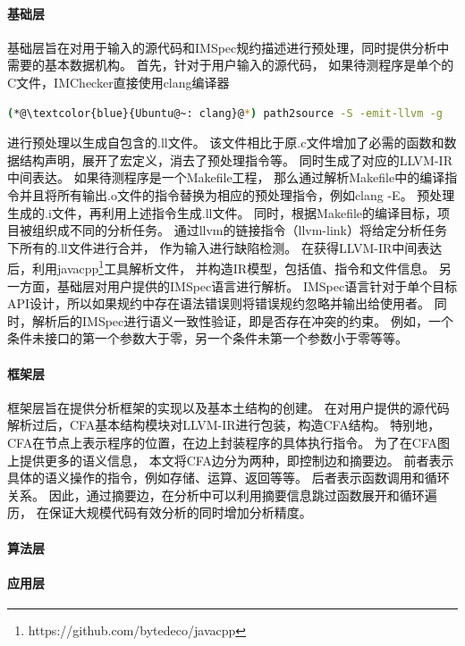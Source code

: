 \paragraph{基础层}
基础层旨在对用于输入的源代码和IMSpec规约描述进行预处理，同时提供分析中需要的基本数据机构。
首先，针对于用户输入的源代码，
如果待测程序是单个的C文件，IMChecker直接使用clang编译器
\begin{lstlisting}[language={bash},
basicstyle=\linespread{0.8}\listingsfont,
numbers=none,
xleftmargin=.25\textwidth]
(*@\textcolor{blue}{Ubuntu@~: clang}@*) path2source -S -emit-llvm -g
\end{lstlisting}
进行预处理以生成自包含的.ll文件。
该文件相比于原.c文件增加了必需的函数和数据结构声明，展开了宏定义，消去了预处理指令等。
同时生成了对应的LLVM-IR中间表达。
如果待测程序是一个Makefile工程，
那么通过解析Makefile中的编译指令并且将所有输出.o文件的指令替换为相应的预处理指令，例如clang -E。
预处理生成的.i文件，再利用上述指令生成.ll文件。
同时，根据Makefile的编译目标，项目被组织成不同的分析任务。
通过llvm的链接指令（llvm-link）将给定分析任务下所有的.ll文件进行合并，
作为输入进行缺陷检测。
在获得LLVM-IR中间表达后，利用javacpp\footnote{https://github.com/bytedeco/javacpp}工具解析文件，
并构造IR模型，包括值、指令和文件信息。
另一方面，基础层对用户提供的IMSpec语言进行解析。
IMSpec语言针对于单个目标API设计，所以如果规约中存在语法错误则将错误规约忽略并输出给使用者。
同时，解析后的IMSpec进行语义一致性验证，即是否存在冲突的约束。
例如，一个条件未接口的第一个参数大于零，另一个条件未第一个参数小于零等等。

\paragraph{框架层}
框架层旨在提供分析框架的实现以及基本土结构的创建。
在对用户提供的源代码解析过后，CFA基本结构模块对LLVM-IR进行包装，构造CFA结构。
特别地，CFA在节点上表示程序的位置，在边上封装程序的具体执行指令。
为了在CFA图上提供更多的语义信息，
本文将CFA边分为两种，即控制边和摘要边。
前者表示具体的语义操作的指令，例如存储、运算、返回等等。
后者表示函数调用和循环关系。
因此，通过摘要边，在分析中可以利用摘要信息跳过函数展开和循环遍历，
在保证大规模代码有效分析的同时增加分析精度。


\paragraph{算法层}

\paragraph{应用层}


